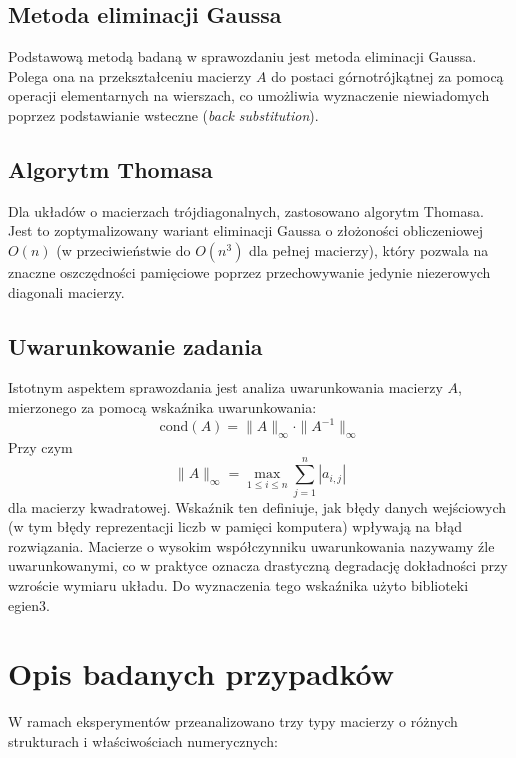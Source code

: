 \documentclass[twoside]{article}
\begin{document}
\subsection{Metoda eliminacji Gaussa}
Podstawową metodą badaną w sprawozdaniu jest metoda eliminacji Gaussa. Polega ona na przekształceniu macierzy $A$ do postaci górnotrójkątnej za pomocą operacji
elementarnych na wierszach, co umożliwia wyznaczenie niewiadomych poprzez podstawianie wsteczne (\textit{back substitution}).

\subsection{Algorytm Thomasa}
Dla układów o macierzach trójdiagonalnych, zastosowano algorytm Thomasa. Jest to zoptymalizowany wariant eliminacji Gaussa o złożoności
obliczeniowej $O(n)$ (w przeciwieństwie do $O(n^3)$ dla pełnej macierzy), który pozwala na znaczne oszczędności pamięciowe poprzez przechowywanie jedynie
niezerowych diagonali macierzy.

\subsection{Uwarunkowanie zadania}
Istotnym aspektem sprawozdania jest analiza uwarunkowania macierzy $A$, mierzonego za pomocą wskaźnika uwarunkowania:
\begin{equation}
    \text{cond}(A) = \|A\|_{\infty} \cdot \|A^{-1}\|_{\infty}
\end{equation}
Przy czym $$\|A\|_\infty = \max_{1 \leq i\leq n} \sum_{j=1}^{n}|a_{i,j}| $$ dla macierzy kwadratowej.
Wskaźnik ten definiuje, jak błędy danych wejściowych (w tym błędy reprezentacji liczb w pamięci komputera) wpływają na błąd rozwiązania.
Macierze o wysokim współczynniku uwarunkowania nazywamy źle uwarunkowanymi, co w praktyce oznacza drastyczną degradację dokładności przy wzroście wymiaru układu.
Do wyznaczenia tego wskaźnika użyto biblioteki egien3.

\section{Opis badanych przypadków}

W ramach eksperymentów przeanalizowano trzy typy macierzy o różnych strukturach i właściwościach numerycznych:
\end{document}
